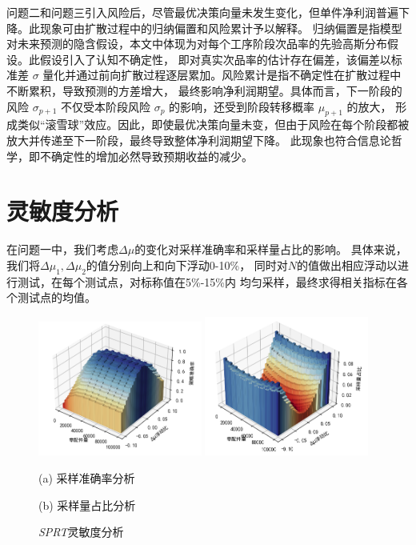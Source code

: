 \documentclass[withoutpreface,bwprint]{cumcmthesis} %
\begin{document}
问题二和问题三引入风险后，尽管最优决策向量未发生变化，但单件净利润普遍下降。此现象可由扩散过程中的归纳偏置和风险累计予以解释。
归纳偏置是指模型对未来预测的隐含假设，本文中体现为对每个工序阶段次品率的先验高斯分布假设。此假设引入了认知不确定性，
即对真实次品率的估计存在偏差，该偏差以标准差 $\sigma$ 量化并通过前向扩散过程逐层累加。风险累计是指不确定性在扩散过程中不断累积，导致预测的方差增大，
最终影响净利润期望。具体而言，下一阶段的风险 $\sigma_{p+1}$ 不仅受本阶段风险 $\sigma_p$ 的影响，还受到阶段转移概率 $\mu_{p+1}$ 的放大，
形成类似“滚雪球”效应。因此，即使最优决策向量未变，但由于风险在每个阶段都被放大并传递至下一阶段，最终导致整体净利润期望下降。
此现象也符合信息论哲学，即不确定性的增加必然导致预期收益的减少。

\section{灵敏度分析}
在问题一中，我们考虑$\Delta \mu$的变化对采样准确率和采样量占比的影响。
具体来说，
我们将$\Delta \mu_1,\Delta \mu_2$的值分别向上和向下浮动0-10\%，
同时对$N$的值做出相应浮动以进行测试，在每个测试点，对标称值在5\%-15\%内
均匀采样，最终求得相关指标在各个测试点的均值。
\begin{figure}[htbp]
	\centering
	\includegraphics[width=0.48\textwidth]{Fig/pro1_sensi_acc.png}
	\includegraphics[width=0.48\textwidth]{Fig/pro1_sensi_ocu.png}
	\begin{minipage}[b]{0.48\textwidth}
		\centering
		(a) 采样准确率分析
	\end{minipage}
	\begin{minipage}[b]{0.48\textwidth}
		\centering
		(b) 采样量占比分析
	\end{minipage}
	\caption{\textit{SPRT}灵敏度分析}
	\label{Pro1_sensi}
\end{figure}
\end{document}
